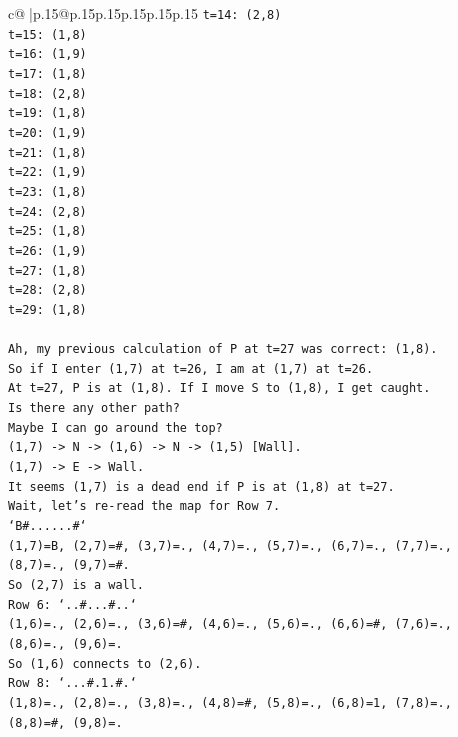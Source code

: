 \documentclass{article}
\begin{document}
{\begin{supertabular}{c@{$\;$}|p{.15\linewidth}@{}p{.15\linewidth}p{.15\linewidth}p{.15\linewidth}p{.15\linewidth}p{.15\linewidth}}
{{{\texttt{t=14: (2,8)} \\
\texttt{t=15: (1,8)} \\
\texttt{t=16: (1,9)} \\
\texttt{t=17: (1,8)} \\
\texttt{t=18: (2,8)} \\
\texttt{t=19: (1,8)} \\
\texttt{t=20: (1,9)} \\
\texttt{t=21: (1,8)} \\
\texttt{t=22: (1,9)} \\
\texttt{t=23: (1,8)} \\
\texttt{t=24: (2,8)} \\
\texttt{t=25: (1,8)} \\
\texttt{t=26: (1,9)} \\
\texttt{t=27: (1,8)} \\
\texttt{t=28: (2,8)} \\
\texttt{t=29: (1,8)} \\
\\ 
\texttt{Ah, my previous calculation of P at t=27 was correct: (1,8).} \\
\texttt{So if I enter (1,7) at t=26, I am at (1,7) at t=26.} \\
\texttt{At t=27, P is at (1,8). If I move S to (1,8), I get caught.} \\
\texttt{Is there any other path?} \\
\texttt{Maybe I can go around the top?} \\
\texttt{(1,7) {-}> N {-}> (1,6) {-}> N {-}> (1,5) {[}Wall{]}.} \\
\texttt{(1,7) {-}> E {-}> Wall.} \\
\texttt{It seems (1,7) is a dead end if P is at (1,8) at t=27.} \\
\texttt{Wait, let's re{-}read the map for Row 7.} \\
\texttt{`B\#......\#`} \\
\texttt{(1,7)=B, (2,7)=\#, (3,7)=., (4,7)=., (5,7)=., (6,7)=., (7,7)=., (8,7)=., (9,7)=\#.} \\
\texttt{So (2,7) is a wall.} \\
\texttt{Row 6: `..\#...\#..`} \\
\texttt{(1,6)=., (2,6)=., (3,6)=\#, (4,6)=., (5,6)=., (6,6)=\#, (7,6)=., (8,6)=., (9,6)=.} \\
\texttt{So (1,6) connects to (2,6).} \\
\texttt{Row 8: `...\#.1.\#.`} \\
\texttt{(1,8)=., (2,8)=., (3,8)=., (4,8)=\#, (5,8)=., (6,8)=1, (7,8)=., (8,8)=\#, (9,8)=.} \\
}}}
\end{supertabular}}
\end{document}
